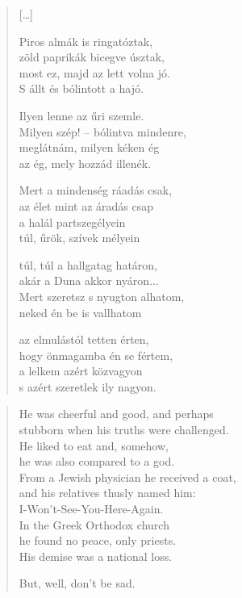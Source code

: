 \documentclass[11pt]{extbook}
\newcommand*{\centeredornament}{\centerline{\pgfornament[width=6cm]{88}}}
\begin{document}
\begin{verse}
  \textnormal{[\ldots]}

  Piros almák is ringatóztak, \\
  zöld paprikák bicegve úsztak, \\
  most ez, majd az lett volna jó. \\
  S állt és bólintott a hajó.

  Ilyen lenne az űri szemle. \\
  Milyen szép! -- bólintva mindenre, \\
  meglátnám, milyen kéken ég \\
  az ég, mely hozzád illenék.

  Mert a mindenség ráadás csak, \\
  az élet mint az áradás csap \\
  a halál partszegélyein \\
  túl, űrök, szívek mélyein

  túl, túl a hallgatag határon, \\
  akár a Duna akkor nyáron... \\
  Mert szeretsz s nyugton alhatom, \\
  neked én be is vallhatom

  az elmulástól tetten érten, \\
  hogy önmagamba én se fértem, \\
  a lelkem azért közvagyon \\
  s azért szeretlek ily nagyon.
\end{verse}

\newpage


\vspace*{-15mm}
\centeredornament



\begin{verse}
  He was cheerful and good, and perhaps \\
  stubborn when his truths were challenged. \\
  He liked to eat and, somehow, \\
  he was also compared to a god. \\
  From a Jewish physician he received a coat, \\
  and his relatives thusly named him: \\
  I-Won't-See-You-Here-Again. \\
  In the Greek Orthodox church \\
  he found no peace, only priests. \\
  His demise was a national loss.

  But, well, don't be sad.
\end{verse}
\end{document}
